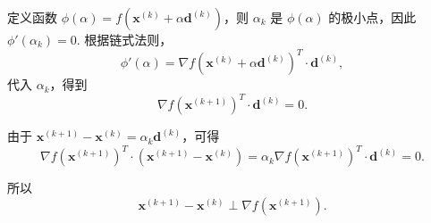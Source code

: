 \documentclass{homework}
\begin{document}
\question

\begin{sol}

定义函数 \(\phi(\alpha) = f(\mathbf{x}^{(k)} + \alpha \mathbf{d}^{(k)})\)，则 \(\alpha_k\) 是 \(\phi(\alpha)\) 的极小点，因此\(\phi'(\alpha_k) = 0.\)
根据链式法则，
\[\phi'(\alpha) = \nabla f(\mathbf{x}^{(k)} + \alpha \mathbf{d}^{(k)})^T \cdot \mathbf{d}^{(k)},\]
代入 \(\alpha_k\)，得到
\[\nabla f(\mathbf{x}^{(k+1)})^T \cdot \mathbf{d}^{(k)} = 0.\]

由于 \(\mathbf{x}^{(k+1)} - \mathbf{x}^{(k)} = \alpha_k \mathbf{d}^{(k)}\)，可得
\[\nabla f(\mathbf{x}^{(k+1)})^T \cdot (\mathbf{x}^{(k+1)} - \mathbf{x}^{(k)}) 
= \alpha_k \nabla f(\mathbf{x}^{(k+1)})^T \cdot \mathbf{d}^{(k)} = 0.\]

所以
\[\mathbf{x}^{(k+1)} - \mathbf{x}^{(k)} \perp \nabla f(\mathbf{x}^{(k+1)}).\]
\end{sol}

\question
\end{document}
